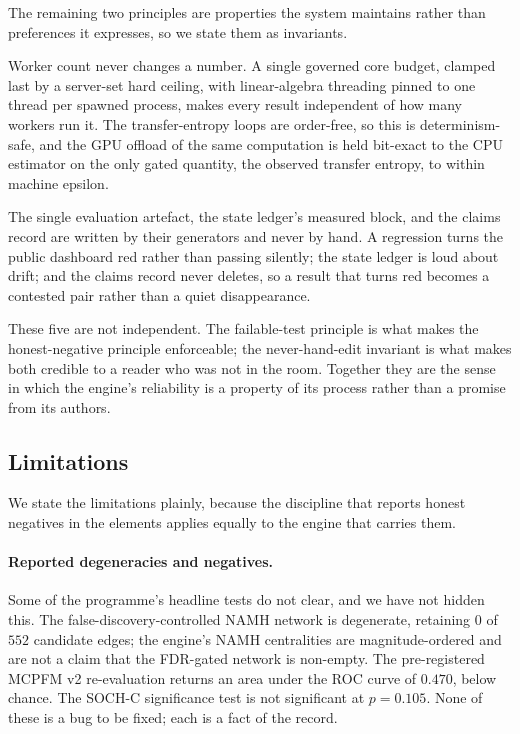 The remaining two principles are properties the system maintains rather than
preferences it expresses, so we state them as invariants.

\begin{invariant}
Worker count never changes a number. A single governed core budget, clamped last
by a server-set hard ceiling, with linear-algebra threading pinned to one thread
per spawned process, makes every result independent of how many workers run it.
The transfer-entropy loops are order-free, so this is determinism-safe, and the
GPU offload of the same computation is held bit-exact to the CPU estimator on the
only gated quantity, the observed transfer entropy, to within machine epsilon.
\end{invariant}

\begin{invariant}
The single evaluation artefact, the state ledger's measured block, and the claims
record are written by their generators and never by hand. A regression turns the
public dashboard red rather than passing silently; the state ledger is loud about
drift; and the claims record never deletes, so a result that turns red becomes a
contested pair rather than a quiet disappearance.
\end{invariant}

These five are not independent. The failable-test principle is what makes the
honest-negative principle enforceable; the never-hand-edit invariant is what
makes both credible to a reader who was not in the room. Together they are the
sense in which the engine's reliability is a property of its process rather than a
promise from its authors.

\subsection{Limitations}

We state the limitations plainly, because the discipline that reports honest
negatives in the elements applies equally to the engine that carries them.

\paragraph{Reported degeneracies and negatives.} Some of the programme's
headline tests do not clear, and we have not hidden this. The
false-discovery-controlled NAMH network is degenerate, retaining $0$ of $552$
candidate edges; the engine's NAMH centralities are magnitude-ordered and are not
a claim that the FDR-gated network is non-empty. The pre-registered MCPFM v2
re-evaluation returns an area under the ROC curve of $0.470$, below chance. The
SOCH-C significance test is not significant at $p=0.105$. None of these is a bug
to be fixed; each is a fact of the record.

